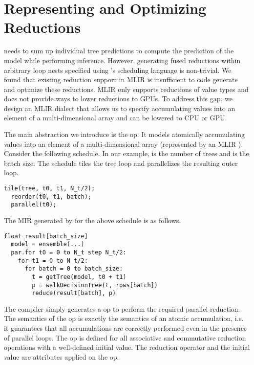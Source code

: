 \section{Representing and Optimizing Reductions}
\label{sec:reduction}
\Treebeard{} needs to sum up individual tree predictions to compute 
the prediction of the model while performing inference. However,
generating fused reductions within arbitrary loop nests specified 
using \Treebeard{}'s scheduling language is non-trivial. We found 
that existing reduction support in MLIR is insufficient to code
generate and optimize these reductions. MLIR only supports reductions
of value types and does not provide ways to lower reductions to GPUs. 
To address this gap, we design an MLIR dialect that allows us to
specify accumulating values into an element of a multi-dimensional array
and can be lowered to CPU or GPU. 

The main abstraction we introduce is the  op. It models 
atomically accumulating values into an element of a 
multi-dimensional array (represented by an MLIR ).
Consider the following \Treebeard{} schedule.
In our example,  is the number of trees 
and  is the batch size. The schedule tiles the 
tree loop and parallelizes the resulting outer loop.
\begin{lstlisting}[style=c++]
  tile(tree, t0, t1, N_t/2);
  reorder(t0, t1, batch);
  parallel(t0);
\end{lstlisting}

The MIR generated by \Treebeard{} for the above schedule is as follows. 
\begin{lstlisting}[style=c++]
  float result[batch_size]
  model = ensemble(...) 
  par.for t0 = 0 to N_t step N_t/2:
    for t1 = 0 to N_t/2:
      for batch = 0 to batch_size:
        t = getTree(model, t0 + t1) 
        p = walkDecisionTree(t, rows[batch])
        reduce(result[batch], p)
\end{lstlisting}

The compiler simply generates a  op to perform
the required parallel reduction. 
The semantics of the  op is exactly the semantics of 
an atomic accumulation, i.e. it guarantees that all accumulations 
are correctly performed even in the presence of parallel loops. 
The  op is defined for all associative and commutative
reduction operations with a well-defined initial value. The 
reduction operator and the initial value are attributes applied
on the  op. 


